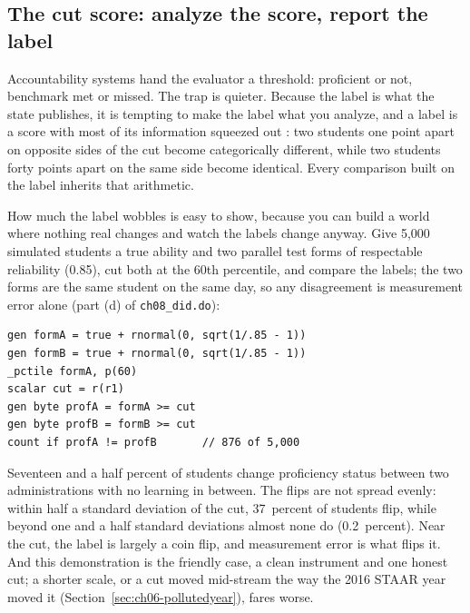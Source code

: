 \documentclass[
    a4paper,
    fontsize=10pt,
    twoside=true,
    numbers=noenddot,
]{kaobook}
\begin{document}
\subsection{The cut score: analyze the score, report the label}\label{ch08-sc-cutscore}
Accountability systems hand the evaluator a threshold: proficient or not, benchmark met or missed. The trap is quieter. Because the label is what the state publishes, it is tempting to make the label what you analyze, and a label is a score with most of its information squeezed out \parencite{osborne2013cleaning}: two students one point apart on opposite sides of the cut become categorically different, while two students forty points apart on the same side become identical. Every comparison built on the label inherits that arithmetic.

How much the label wobbles is easy to show, because you can build a world where nothing real changes and watch the labels change anyway. Give 5{,}000 simulated students a true ability and two parallel test forms of respectable reliability (0.85), cut both at the 60th percentile, and compare the labels; the two forms are the same student on the same day, so any disagreement is measurement error alone (part (d) of \texttt{ch08\_did.do}):
\par
{\footnotesize
\begin{verbatim}
gen formA = true + rnormal(0, sqrt(1/.85 - 1))
gen formB = true + rnormal(0, sqrt(1/.85 - 1))
_pctile formA, p(60)
scalar cut = r(r1)
gen byte profA = formA >= cut
gen byte profB = formB >= cut
count if profA != profB       // 876 of 5,000
\end{verbatim}
}
Seventeen and a half percent of students change proficiency status between two administrations with no learning in between. The flips are not spread evenly: within half a standard deviation of the cut, 37~percent of students flip, while beyond one and a half standard deviations almost none do (0.2~percent). Near the cut, the label is largely a coin flip, and measurement error is what flips it. And this demonstration is the friendly case, a clean instrument and one honest cut; a shorter scale, or a cut moved mid-stream the way the 2016 STAAR year moved it (Section~\ref{sec:ch06-pollutedyear}), fares worse.
\end{document}
